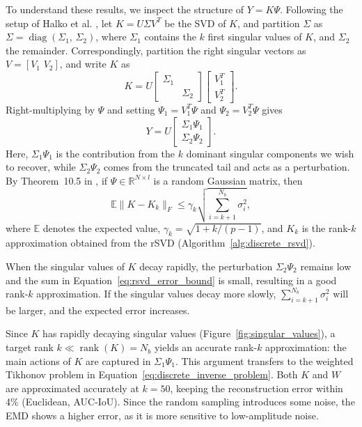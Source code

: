 To understand these results, we inspect the structure of $Y = K \Psi$. Following the setup of Halko et al. \cite[Sec.~9]{halkoFindingStructureRandomness2011}, let $K = U \Sigma V^T$ be the SVD of $K$, and partition $\Sigma$ as $\Sigma = \operatorname{diag}(\Sigma_1,\, \Sigma_2)$, where $\Sigma_1$ contains the $k$ first singular values of $K$, and $\Sigma_2$ the remainder. Correspondingly, partition the right singular vectors as $V = [V_1\,\, V_2]$, and write $K$ as
\begin{equation}\label{eq:rsvd_partitioned_1}
    K = U \begin{bmatrix}
    \Sigma_1 & \\ & \Sigma_2
    \end{bmatrix}
    \begin{bmatrix}
    V_1^T \\ V_2^T
    \end{bmatrix}.
\end{equation}
Right-multiplying by $\Psi$ and setting $\Psi_1 = V_1^T \Psi$ and $\Psi_2 = V_2^T \Psi$ gives
\begin{equation*}\label{eq:rsvd_partitioned_2}
    Y = U \begin{bmatrix}
    \Sigma_1 \Psi_1 \\
    \Sigma_2 \Psi_2
    \end{bmatrix}.
\end{equation*}
Here, $\Sigma_1 \Psi_1$ is the contribution from the $k$ dominant singular components we wish to recover, while $\Sigma_2 \Psi_2$ comes from the truncated tail and acts as a perturbation. By Theorem~10.5 in \cite{halkoFindingStructureRandomness2011}, if $\Psi \in \mathbb{R}^{N \times l}$ is a random Gaussian matrix, then
\begin{equation}\label{eq:rsvd_error_bound}
    \mathbb{E}\| K - K_k \|_F \le
    \gamma_k \sqrt{\sum_{i = k+1}^{N_b} \sigma_i^2},
\end{equation}
where $\mathbb{E}$ denotes the expected value, $\gamma_k = \sqrt{1 + k / (p - 1)}$, and $K_k$ is the rank-$k$ approximation obtained from the rSVD (Algorithm~\ref{alg:discrete_rsvd}).

When the singular values of $K$ decay rapidly, the perturbation $\Sigma_2 \Psi_2$ remains low and the sum in Equation~\eqref{eq:rsvd_error_bound} is small, resulting in a good rank-$k$ approximation. If the singular values decay more slowly, $\sum_{i=k+1}^{N_b} \sigma_i^2$ will be larger, and the expected error increases.

Since $K$ has rapidly decaying singular values
(Figure~\ref{fig:singular_values}), a target rank
$k \ll \operatorname{rank}(K) = N_b$ yields an accurate rank-$k$
approximation: the main actions of $K$ are captured in $\Sigma_1 \Psi_1$. This argument transfers to the weighted Tikhonov problem in Equation~\eqref{eq:discrete_inverse_problem}. Both $K$ and $W$ are approximated accurately at $k = 50$, keeping the reconstruction error within 4\% (Euclidean, AUC-IoU). Since the random sampling introduces some noise, the EMD shows a higher error, as it is more sensitive to low-amplitude noise.


